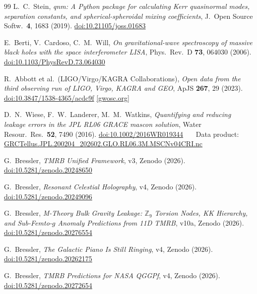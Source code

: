 \documentclass[11pt,a4paper]{article}
\begin{document}
\begin{thebibliography}{99}
  L.~C.~Stein,
  \textit{qnm: A Python package for calculating Kerr quasinormal modes, separation
    constants, and spherical-spheroidal mixing coefficients},
  J.\ Open Source Softw.\ \textbf{4}, 1683 (2019).
  \href{https://doi.org/10.21105/joss.01683}{doi:10.21105/joss.01683}

  E.~Berti, V.~Cardoso, C.~M.~Will,
  \textit{On gravitational-wave spectroscopy of massive black holes with the space
    interferometer LISA},
  Phys.\ Rev.\ D \textbf{73}, 064030 (2006).
  \href{https://doi.org/10.1103/PhysRevD.73.064030}{doi:10.1103/PhysRevD.73.064030}

  R.~Abbott et al.\ (LIGO/Virgo/KAGRA Collaborations),
  \textit{Open data from the third observing run of LIGO, Virgo, KAGRA and GEO},
  ApJS \textbf{267}, 29 (2023).
  \href{https://doi.org/10.3847/1538-4365/acdc9f}{doi:10.3847/1538-4365/acdc9f}
  \href{https://gwosc.org}{[gwosc.org]}

  D.~N.~Wiese, F.~W.~Landerer, M.~M.~Watkins,
  \textit{Quantifying and reducing leakage errors in the JPL RL06 GRACE mascon solution},
  Water Resour.\ Res.\ \textbf{52}, 7490 (2016).
  \href{https://doi.org/10.1002/2016WR019344}{doi:10.1002/2016WR019344}
  ~~~Data product:
  \href{https://podaac.jpl.nasa.gov/dataset/TELLUS_GRAC-GRFO_MASCON_CRI_GRID_RL06.3_V4}{GRCTellus.JPL.200204\_202602.GLO.RL06.3M.MSCNv04CRI.nc}

  G.~Bressler,
  \textit{TMRB Unified Framework}, v3,
  Zenodo (2026).
  \href{https://doi.org/10.5281/zenodo.20248650}{doi:10.5281/zenodo.20248650}

  G.~Bressler,
  \textit{Resonant Celestial Holography}, v4,
  Zenodo (2026).
  \href{https://doi.org/10.5281/zenodo.20249096}{doi:10.5281/zenodo.20249096}

  G.~Bressler,
  \textit{M-Theory Bulk Gravity Leakage: $\mathbb{Z}_9$ Torsion Nodes, KK Hierarchy,
    and Sub-Femto-$g$ Anomaly Predictions from 11D TMRB}, v10a,
  Zenodo (2026).
  \href{https://doi.org/10.5281/zenodo.20276554}{doi:10.5281/zenodo.20276554}

  G.~Bressler,
  \textit{The Galactic Piano Is Still Ringing}, v4,
  Zenodo (2026).
  \href{https://doi.org/10.5281/zenodo.20262175}{doi:10.5281/zenodo.20262175}

  G.~Bressler,
  \textit{TMRB Predictions for NASA QGGPf}, v4,
  Zenodo (2026).
  \href{https://doi.org/10.5281/zenodo.20272654}{doi:10.5281/zenodo.20272654}


\end{thebibliography}
\end{document}
